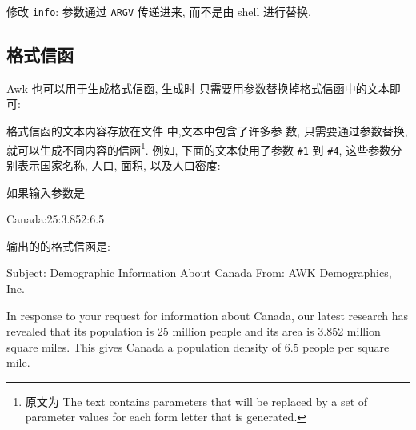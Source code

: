 \begin{exercise}
    \label{exer:info}
    修改 \texttt{info}: 参数通过 \texttt{ARGV} 传递进来, 而不是由 shell 
    进行替换.
\end{exercise}

\subsection{格式信函}
\label{subsec:form_letters}

Awk 也可以用于生成格式信函, 生成时
只需要用参数替换掉格式信函中的文本即可:
\begin{center}
\end{center}
格式信函的文本内容存放在文件  中,文本中包含了许多参
数, 只需要通过参数替换, 就可以生成不同内容的信函\footnote{原文为 The text
    contains parameters that will be replaced by a set of parameter values
for each form letter that is generated.}. 例如, 下面的文本使用了参数
\verb'#1' 到 \verb'#4', 这些参数分别表示国家名称, 人口, 面积, 以及人口密度:

如果输入参数是
\begin{awkcode}
    Canada:25:3.852:6.5
\end{awkcode}
输出的的格式信函是:
\begin{awkcode}
    Subject: Demographic Information About Canada
    From: AWK Demographics, Inc.

    In response to your request for information about Canada,
    our latest research has revealed that its population is 25
    million people and its area is 3.852 million square miles.
    This gives Canada a population density of 6.5 people per
    square mile.
\end{awkcode}

